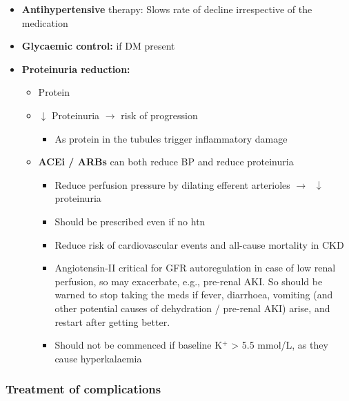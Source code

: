 \documentclass[
  12pt,
]{memoir}
\providecommand{\tightlist}{%
  \setlength{\itemsep}{0pt}\setlength{\parskip}{0pt}}
\begin{document}
\begin{itemize}
\tightlist
\item
  \textbf{Antihypertensive} therapy: Slows rate of decline irrespective
  of the medication
\item
  \textbf{Glycaemic control:} if DM present
\item
  \textbf{Proteinuria reduction:}

  \begin{itemize}
  \tightlist
  \item
    Protein
  \item
    \(\downarrow\) Proteinuria \(\rightarrow\) risk of progression

    \begin{itemize}
    \tightlist
    \item
      As protein in the tubules trigger inflammatory damage
    \end{itemize}
  \item
    \textbf{ACEi / ARBs} can both reduce BP and reduce proteinuria

    \begin{itemize}
    \tightlist
    \item
      Reduce perfusion pressure by dilating efferent arterioles
      \(\rightarrow\;\;\downarrow\) proteinuria
    \item
      Should be prescribed even if no htn
    \item
      Reduce risk of cardiovascular events and all-cause mortality in
      CKD
    \item
      Angiotensin-II critical for GFR autoregulation in case of low
      renal perfusion, so may exacerbate, e.g., pre-renal AKI. So should
      be warned to stop taking the meds if fever, diarrhoea, vomiting
      (and other potential causes of dehydration / pre-renal AKI) arise,
      and restart after getting better.
    \item
      Should not be commenced if baseline K\(^+\) \textgreater{} 5.5
      mmol/L, as they cause hyperkalaemia
    \end{itemize}
  \end{itemize}
\end{itemize}

\hypertarget{treatment-of-complications}{%
\subsubsection{Treatment of
complications}\label{treatment-of-complications}}
\end{document}

